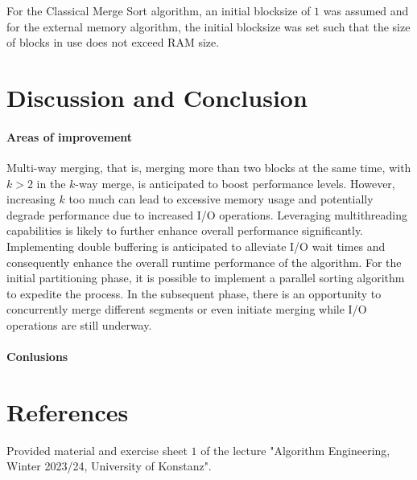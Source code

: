 \documentclass[twocolumn]{article}
\begin{document}
\begin{center}
\end{center}

For the Classical Merge Sort algorithm, an initial blocksize of \( 1 \) was assumed and for the external memory algorithm, the initial blocksize was set such that the size of blocks in use does not exceed RAM size.


\section{Discussion and Conclusion}

\paragraph{Areas of improvement}
Multi-way merging, that is, merging more than two blocks at the same time, with \( k > 2 \)  in the \( k \)-way merge, is anticipated to boost performance levels.
However, increasing \(k\) too much can lead to excessive memory usage and potentially degrade performance due to increased I/O operations.
Leveraging multithreading capabilities is likely to further enhance overall performance significantly.
Implementing double buffering is anticipated to alleviate I/O wait times and consequently enhance the overall runtime performance of the algorithm.
For the initial partitioning phase, it is possible to implement a parallel sorting algorithm to expedite the process.
In the subsequent phase, there is an opportunity to concurrently merge different segments or even initiate merging while I/O operations are still underway.

\paragraph{Conlusions}


\section{References}
Provided material and exercise sheet \( 1\) of the lecture "Algorithm Engineering, Winter 2023/24, University of Konstanz".
\end{document}
